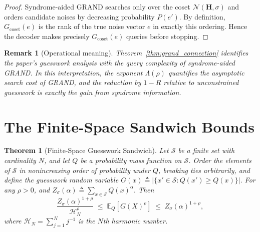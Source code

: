 \documentclass[journal,10pt,onecolumn]{IEEEtran}
\newtheorem{theorem}{Theorem}
\newtheorem{remark}{Remark}
\newcommand{\Nb}{\mathcal{N}}
\newcommand{\Hm}{\mathbf{H}}
\newcommand{\Harm}{\mathcal{H}}
\begin{document}
\begin{proof}
Syndrome-aided GRAND searches only over the coset
\(\Nb(\Hm,\sigma)\) and orders candidate noises by decreasing
probability \(P(e')\). By definition, \(G_{\mathrm{coset}}(e)\) is the
rank of the true noise vector \(e\) in exactly this ordering. Hence the
decoder makes precisely \(G_{\mathrm{coset}}(e)\) queries before
stopping.
\end{proof}

\begin{remark}[Operational meaning]
Theorem~\ref{thm:grand_connection} identifies the paper's guesswork
analysis with the query complexity of syndrome-aided GRAND. In this
interpretation, the exponent \(\Lambda(\rho)\) quantifies the
asymptotic search cost of GRAND, and the reduction by \(1-R\) relative
to unconstrained guesswork is exactly the gain from syndrome
information.
\end{remark}

\section{The Finite-Space Sandwich Bounds}
\label{sec:sandwich}

\begin{theorem}[Finite-Space Guesswork Sandwich]
\label{thm:sandwich}
Let $\mathcal S$ be a finite set with cardinality $N$, and let $Q$ be a
probability mass function on $\mathcal S$. Order the elements of
$\mathcal S$ in nonincreasing order of probability under $Q$, breaking ties
arbitrarily, and define the guesswork random variable
\(
G(x)\triangleq \bigl|\{x'\in\mathcal S : Q(x')\ge Q(x)\}\bigr|.
\)
For any $\rho>0$, and
\(
Z_\sigma (\alpha)\triangleq \sum_{x\in\mathcal S} Q(x)^\alpha .
\)
Then
\begin{equation}
\frac{Z_\sigma (\alpha)^{1+\rho}}{\Harm_N^\rho}
\;\le\;
\mathbb E_Q\!\left[G(X)^\rho\right]
\;\le\;
Z_\sigma (\alpha)^{1+\rho},
\label{eq:sandwich_correct}
\end{equation}
where $\Harm_N=\sum_{j=1}^N j^{-1}$ is the $N$th harmonic number.
\end{theorem}
\end{document}
